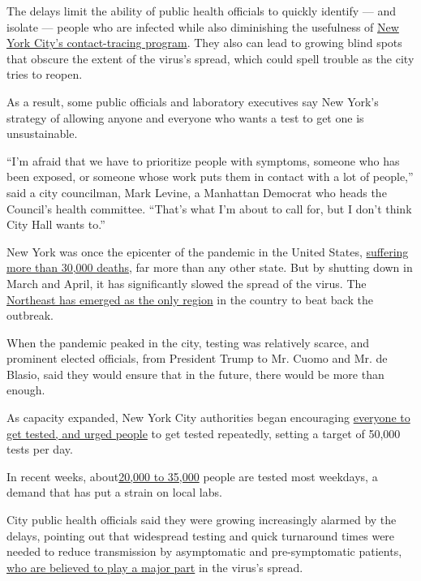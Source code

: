 The delays limit the ability of public health officials to quickly
identify --- and isolate --- people who are infected while also
diminishing the usefulness of
\href{https://www.nytimes3xbfgragh.onion/2020/06/21/nyregion/nyc-contact-tracing.html}{New
York City's contact-tracing program}. They also can lead to growing
blind spots that obscure the extent of the virus's spread, which could
spell trouble as the city tries to reopen.

As a result, some public officials and laboratory executives say New
York's strategy of allowing anyone and everyone who wants a test to get
one is unsustainable.

``I'm afraid that we have to prioritize people with symptoms, someone
who has been exposed, or someone whose work puts them in contact with a
lot of people,'' said a city councilman, Mark Levine, a Manhattan
Democrat who heads the Council's health committee. ``That's what I'm
about to call for, but I don't think City Hall wants to.''

New York was once the epicenter of the pandemic in the United States,
\href{https://www.nytimes3xbfgragh.onion/interactive/2020/us/new-york-coronavirus-cases.html}{suffering
more than 30,000 deaths}, far more than any other state. But by shutting
down in March and April, it has significantly slowed the spread of the
virus. The
\href{https://www.nytimes3xbfgragh.onion/2020/07/22/us/coronavirus-northeast-governors.html}{Northeast
has emerged as the only region} in the country to beat back the
outbreak.

When the pandemic peaked in the city, testing was relatively scarce, and
prominent elected officials, from President Trump to Mr. Cuomo and Mr.
de Blasio, said they would ensure that in the future, there would be
more than enough.

As capacity expanded, New York City authorities began encouraging
\href{https://www.nychealthandhospitals.org/covid-19-testing-sites/}{everyone
to get tested, and urged people} to get tested repeatedly, setting a
target of 50,000 tests per day.

In recent weeks,
about\href{https://www1.nyc.gov/site/doh/covid/covid-19-data.page}{20,000
to 35,000} people are tested most weekdays, a demand that has put a
strain on local labs.

City public health officials said they were growing increasingly alarmed
by the delays, pointing out that widespread testing and quick turnaround
times were needed to reduce transmission by asymptomatic and
pre-symptomatic patients,
\href{https://www.nytimes3xbfgragh.onion/2020/06/27/world/europe/coronavirus-spread-asymptomatic.html}{who
are believed to play a major part} in the virus's spread.

